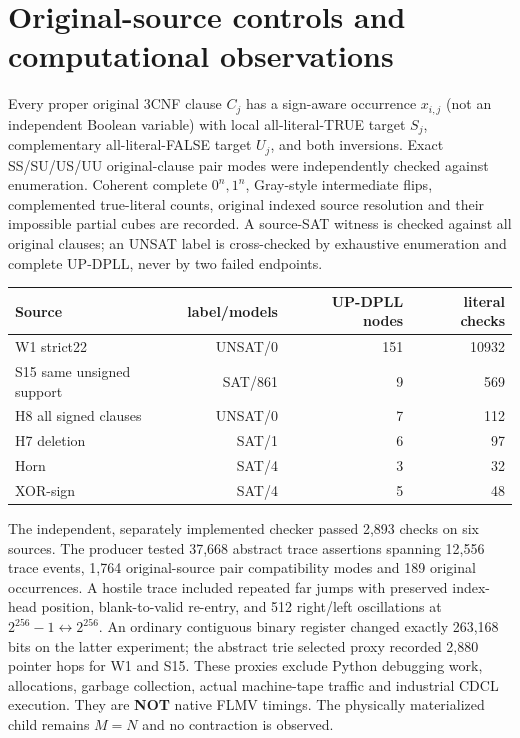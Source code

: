 \documentclass[11pt]{article}
\begin{document}
\section*{Original-source controls and computational observations}
Every proper original 3CNF clause $C_j$ has a sign-aware occurrence $x_{i,j}$ (not an independent Boolean variable) with local all-literal-TRUE target $S_j$, complementary all-literal-FALSE target $U_j$, and both inversions. Exact SS/SU/US/UU original-clause pair modes were independently checked against enumeration. Coherent complete $0^n,1^n$, Gray-style intermediate flips, complemented true-literal counts, original indexed source resolution and their impossible partial cubes are recorded. A source-SAT witness is checked against all original clauses; an UNSAT label is cross-checked by exhaustive enumeration and complete UP-DPLL, never by two failed endpoints.
\begin{center}\begin{tabular}{lrrr}\toprule
Source & label/models & UP-DPLL nodes & literal checks\\\midrule
W1 strict22 & UNSAT/0 &151&10932\\
S15 same unsigned support & SAT/861&9&569\\
H8 all signed clauses & UNSAT/0&7&112\\
H7 deletion & SAT/1&6&97\\
Horn & SAT/4&3&32\\
XOR-sign & SAT/4&5&48\\\bottomrule\end{tabular}\end{center}
The independent, separately implemented checker passed 2,893 checks on six sources. The producer tested 37,668 abstract trace assertions spanning 12,556 trace events, 1,764 original-source pair compatibility modes and 189 original occurrences. A hostile trace included repeated far jumps with preserved index-head position, blank-to-valid re-entry, and 512 right/left oscillations at $2^{256}-1\leftrightarrow2^{256}$. An ordinary contiguous binary register changed exactly 263,168 bits on the latter experiment; the abstract trie selected proxy recorded 2,880 pointer hops for W1 and S15. These proxies exclude Python debugging work, allocations, garbage collection, actual machine-tape traffic and industrial CDCL execution. They are \textbf{NOT} native FLMV timings. The physically materialized child remains $M=N$ and no contraction is observed.
\end{document}
